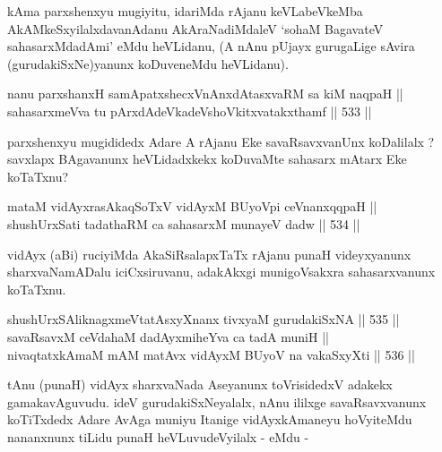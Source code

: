 \begin{artha}
kAma parxshenxyu mugiyitu, idariMda rAjanu keVLabeVkeMba
AkAMkeSxyilalxdavanAdanu AkAraNadiMdaleV `so\s haM BagavateV
sahasarxMdadAmi' eMdu heVLidanu, (A nAnu pUjayx gurugaLige sAvira
(gurudakiSxNe)yanunx koDuveneMdu heVLidanu).
\end{artha} 


\begin{shl}
nanu parxshanxH samApatxshecxVnAnxdAtasxvaRM sa kiM naqpaH || \\
sahasarxmeVva tu pArxdAdeVkadeVshoVkitxvatakxthamf \hfill || 533 ||  
\end{shl}

\begin{artha}
parxshenxyu mugididedx Adare A rAjanu Eke savaRsavxvanUnx koDalilalx
? savxlapx BAgavanunx heVLidadxkekx koDuvaMte sahasarx mAtarx Eke
koTaTxnu?
\end{artha}


\begin{shl}
mataM vidAyxrasAkaqSoTxV vidAyxM BUyoV\s pi ceVnanxqqpaH || \\
shushUrxSati tadathaRM ca sahasarxM munayeV dadw \hfill || 534 ||  
\end{shl}

\begin{artha}
vidAyx (aBi) ruciyiMda AkaSiRsalapxTaTx rAjanu punaH videyxyanunx
sharxvaNamADalu iciCxsiruvanu, adakAkxgi munigoVsakxra sahasarxvanunx
koTaTxnu.
\end{artha}


\begin{shl}
shushUrxSAliknagxmeVtatAsxyXnanx tivxyaM gurudakiSxNA \hfill || 535 ||  \\
savaRsavxM ceVdahaM dadAyxmiheYva ca tadA muniH || \\
nivaqtatxkAmaM mAM matAvx vidAyxM BUyoV na vakaSxyXti \hfill || 536 ||  
\end{shl}

\begin{artha}
tAnu (punaH) vidAyx sharxvaNada Aseyanunx toVrisidedxV adakekx
gamakavAguvudu. ideV gurudakiSxNeyalalx, nAnu ililxge savaRsavxvanunx
koTiTxdedx Adare AvAga muniyu Itanige vidAyxkAmaneyu hoVyiteMdu
nananxnunx tiLidu punaH heVLuvudeVyilalx - eMdu -
\end{artha}

